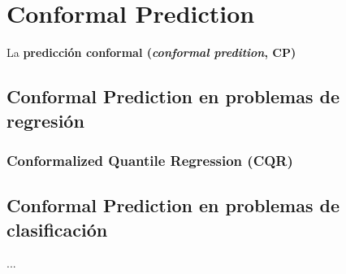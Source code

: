 





\section{Conformal Prediction}

La \textbf{predicción conformal (\textit{conformal predition}, CP)} 


\subsection{Conformal Prediction en problemas de regresión}

\subsubsection{Conformalized Quantile Regression (CQR)}


\subsubsection{}




\subsection{Conformal Prediction en problemas de clasificación}

...

